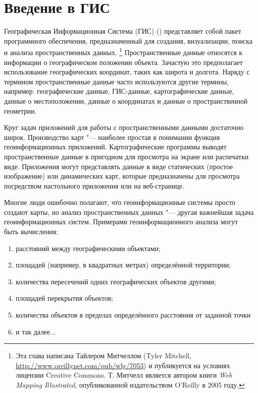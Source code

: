 \pagestyle{scrheadings}
\chapter{Введение в ГИС}\label{label_intro}


Географическая Информационная Система (ГИС) (\cite{mitchel05}) представляет
собой пакет программного обеспечения, предназначенный для
создания, визуализации, поиска и анализа пространственных данных.
\footnote{Эта глава написана Тайлером Митчеллом (Tyler Mitchell,
\url{http://www.oreillynet.com/pub/wlg/7053}) и публикуется на условиях
лицензии Creative Commons. Т. Митчелл является автором книги
\textit{Web Mapping Illustrated}, опубликованной издательством O'Reilly
в 2005 году.}
Пространственные данные относятся к информации о географическом положении
объекта. Зачастую это предполагает использование географических координат,
таких как широта и долгота. Наряду с термином пространственные данные часто
используются другие термины, например: географические данные, ГИС-данные,
картографические данные, данные о местоположении, данные о координатах
и данные о пространственной геометрии.

Круг задач приложений для работы с пространственными данными достаточно широк.
Производство карт "--- наиболее простая в понимании функция
геоинформационных приложений. Картографические программы выводят
пространственные данные в пригодном для просмотра на экране или распечатки виде.
Приложения могут представлять данные в виде статических (простое изображение) или
динамических карт, которые предназначены для просмотра посредством
настольного приложения или на веб-странице.

Многие люди ошибочно полагают, что геоинформационные системы просто
создают карты, но анализ пространственных данных "--- другая важнейшая
задача геоинформационных систем. Примерами геоинформационного анализа
могут быть вычисления:

\begin{enumerate}
\item расстояний между географическими объектами;
\item площадей (например, в квадратных метрах) определённой территории;
\item количества пересечений одних географических объектов другими;
\item площадей перекрытия объектов;
\item количества объектов в пределах определённого расстояния от заданной точки
\item и так далее...
\end{enumerate}

